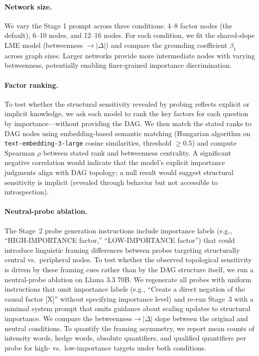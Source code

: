 \documentclass[11pt]{article}
\begin{document}
\paragraph{Network size.} We vary the Stage 1 prompt across three conditions: 4--8 factor nodes (the default), 6--10 nodes, and 12--16 nodes. For each condition, we fit the shared-slope LME model (betweenness $\rightarrow |\Delta|$) and compare the grounding coefficient $\beta_1$ across graph sizes. Larger networks provide more intermediate nodes with varying betweenness, potentially enabling finer-grained importance discrimination.

\paragraph{Factor ranking.} To test whether the structural sensitivity revealed by probing reflects explicit or implicit knowledge, we ask each model to rank the key factors for each question by importance---without providing the DAG. We then match the stated ranks to DAG nodes using embedding-based semantic matching (Hungarian algorithm on \texttt{text-embedding-3-large} cosine similarities, threshold $\geq 0.5$) and compute Spearman $\rho$ between stated rank and betweenness centrality. A significant negative correlation would indicate that the model's explicit importance judgments align with DAG topology; a null result would suggest structural sensitivity is implicit (revealed through behavior but not accessible to introspection).

\paragraph{Neutral-probe ablation.} The Stage~2 probe generation instructions include importance labels (e.g., ``HIGH-IMPORTANCE factor,'' ``LOW-IMPORTANCE factor'') that could introduce linguistic framing differences between probes targeting structurally central vs.\ peripheral nodes. To test whether the observed topological sensitivity is driven by these framing cues rather than by the DAG structure itself, we run a neutral-probe ablation on Llama 3.3 70B. We regenerate all probes with uniform instructions that omit importance labels (e.g., ``Create a direct negation of the causal factor [X]'' without specifying importance level) and re-run Stage~3 with a minimal system prompt that omits guidance about scaling updates to structural importance. We compare the betweenness$\rightarrow|\Delta|$ slope between the original and neutral conditions. To quantify the framing asymmetry, we report mean counts of intensity words, hedge words, absolute quantifiers, and qualified quantifiers per probe for high- vs.\ low-importance targets under both conditions.
\end{document}
